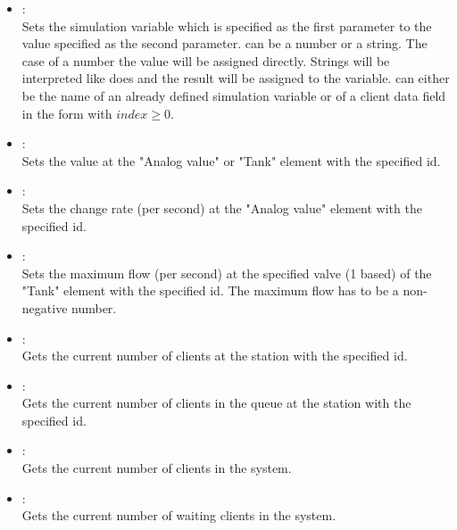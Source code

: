 \begin{itemize}

\item
{}:\\
Sets the simulation variable which is specified as the first parameter to the value specified as the second parameter.  
 can be a number or a string. The case of a number the value will be assigned directly.
Strings will be interpreted like  does and the result will be assigned to the variable. 
can either be the name of an already defined simulation variable or of a client data field in the form
 with $index\ge0$. 
  
\item
{}:\\
Sets the value at the "Analog value" or "Tank" element with the specified id.
  
\item
{}:\\
Sets the change rate (per second) at the "Analog value" element with the specified id.
  
\item
{}:\\
Sets the maximum flow (per second) at the specified valve (1 based) of the "Tank" element
with the specified id. The maximum flow has to be a non-negative number.  
  
\item
{}:\\
Gets the current number of clients at the station with the specified id.
  
\item
{}:\\
Gets the current number of clients in the queue at the station with the specified id.

\item
{}:\\
Gets the current number of clients in the system.
  
\item
{}:\\
Gets the current number of waiting clients in the system.

\end{itemize}


